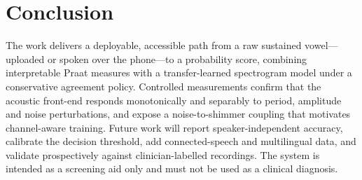 \section{Conclusion}
The work delivers a deployable, accessible path from a raw sustained vowel---uploaded or spoken over the phone---to a probability score, combining interpretable Praat measures with a transfer-learned spectrogram model under a conservative agreement policy. Controlled measurements confirm that the acoustic front-end responds monotonically and separably to period, amplitude and noise perturbations, and expose a noise-to-shimmer coupling that motivates channel-aware training. Future work will report speaker-independent accuracy, calibrate the decision threshold, add connected-speech and multilingual data, and validate prospectively against clinician-labelled recordings. The system is intended as a screening aid only and must not be used as a clinical diagnosis.


